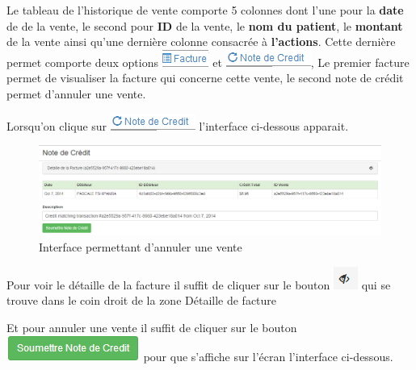 \documentclass[12pt,a4paper]{report}
\begin{document}
Le tableau de l'historique de vente comporte 5 colonnes dont l'une pour la\textbf{ date} de de la vente, le second pour \textbf{ID }de la vente, le \textbf{nom du patient}, le \textbf{montant} de la vente ainsi qu'une dernière colonne consacrée à \textbf{l'actions}. Cette dernière permet comporte deux options \includegraphics[scale=0.7]{pic/FactureF.png}  et \includegraphics[scale=0.7]{pic/NoteCredit.png}, Le premier facture permet de visualiser  la facture qui concerne cette vente, le second note de crédit permet d'annuler une vente. 

Lorsqu'on clique sur \includegraphics[scale=0.7]{pic/NoteCredit.png}  l'interface ci-dessous apparait.

\begin{figure}[h]
\begin{center}
\includegraphics[width=14cm]{pic/NoteCreditMenu.png}
\end{center}
\caption{Interface permettant d'annuler une vente}
\label{Interface permettant d'annuler une vente}
\end{figure}

Pour voir le détaille de la facture il suffit de cliquer sur le bouton \includegraphics[scale=0.7]{pic/SeeInvoice.png} qui se trouve dans le coin droit de la zone Détaille de facture   


Et pour annuler une vente il suffit de cliquer sur le bouton \includegraphics[scale=0.7]{pic/SubmitNoteCredit.png}  pour que s'affiche sur l'écran l'interface ci-dessous.
\end{document}

